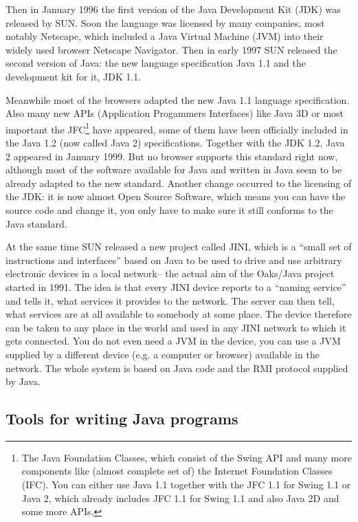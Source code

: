 Then in January 1996 the first version of the Java Development Kit (JDK) 
was released by SUN. Soon the language was licensed by many companies,
most notably Netscape, which included a Java Virtual Machine (JVM) into
their widely used browser Netscape Navigator. Then in early 1997
SUN released the second version of Java: the new language specification 
Java 1.1 and the development kit for it, JDK 1.1.

Meanwhile most of the browsers adapted the new Java 1.1 language specification.
Also many new APIs (Application Progammers Interfaces) like Java 3D or 
most important the JFC\footnote{The Java Foundation Classes, which
consist of the Swing API and many more components like (almost complete set of)  
the Internet Foundation Classes (IFC). You can either use Java 1.1 together
with the JFC 1.1 for Swing 1.1 or Java 2, which already includes JFC 1.1 for
Swing 1.1 and also Java 2D and some more APIs.}
have appeared, some
of them have been officially included in the Java 1.2 (now called Java 2)
specifications. Together with the JDK 1.2, Java 2 appeared in January 1999.
But no browser supports this standard right now, although most
of the software available for Java and written in Java seem to be
already adapted to the new standard. Another change occurred to the
licensing of the JDK: it is now almost Open Source Software, which
means you can have the source code and change it, you only have to make
sure it still conforms to the Java standard.

At the same time SUN released a new project called JINI, which is
a ``small set of instructions and interfaces'' based on Java to
be used to drive and use arbitrary electronic devices in a local network--
the actual aim of the Oaks/Java project started in 1991. The idea is that every 
JINI device reports to a ``naming service'' and tells it, what services
it provides to the network. The server can then tell, what services are at
all available to somebody at some place. The device therefore can be 
taken to any place in the world and used in any JINI network to which
it gets connected. You do not even need a JVM in the device, you can 
use a JVM supplied by a different device (e.g. a computer or browser) 
available in the network. The whole system is based on Java code and
the RMI protocol supplied by Java.



\subsection{Tools for writing Java programs}

